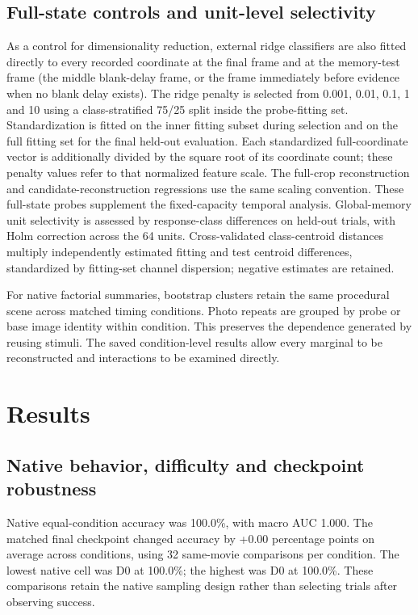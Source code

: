 \documentclass[11pt]{article}
\begin{document}
\subsection{Full-state controls and unit-level selectivity}
As a control for dimensionality reduction, external ridge classifiers are also fitted directly to every recorded coordinate at the final frame and at the memory-test frame (the middle blank-delay frame, or the frame immediately before evidence when no blank delay exists). The ridge penalty is selected from 0.001, 0.01, 0.1, 1 and 10 using a class-stratified 75/25 split inside the probe-fitting set. Standardization is fitted on the inner fitting subset during selection and on the full fitting set for the final held-out evaluation. Each standardized full-coordinate vector is additionally divided by the square root of its coordinate count; these penalty values refer to that normalized feature scale. The full-crop reconstruction and candidate-reconstruction regressions use the same scaling convention. These full-state probes supplement the fixed-capacity temporal analysis. Global-memory unit selectivity is assessed by response-class differences on held-out trials, with Holm correction across the 64 units. Cross-validated class-centroid distances multiply independently estimated fitting and test centroid differences, standardized by fitting-set channel dispersion; negative estimates are retained.

For native factorial summaries, bootstrap clusters retain the same procedural scene across matched timing conditions. Photo repeats are grouped by probe or base image identity within condition. This preserves the dependence generated by reusing stimuli. The saved condition-level results allow every marginal to be reconstructed and interactions to be examined directly.
\section{Results}
\subsection{Native behavior, difficulty and checkpoint robustness}
Native equal-condition accuracy was 100.0\%, with macro AUC 1.000. The matched final checkpoint changed accuracy by +0.00 percentage points on average across conditions, using 32 same-movie comparisons per condition. The lowest native cell was D0 at 100.0\%; the highest was D0 at 100.0\%. These comparisons retain the native sampling design rather than selecting trials after observing success.
\end{document}
